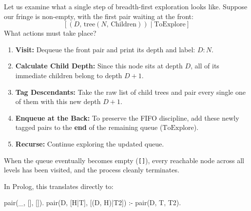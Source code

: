 Let us examine what a single step of breadth-first exploration looks like. Suppose our fringe is non-empty, with the first pair waiting at the front:
\[
[(D,\, \text{tree}(N,\, \text{Children})) \mid \text{ToExplore}]
\]
What actions must take place?
\begin{enumerate}
    \item \textbf{Visit:} Dequeue the front pair and print its depth and label: $D:N$.
    \item \textbf{Calculate Child Depth:} Since this node sits at depth $D$, all of its immediate children belong to depth $D + 1$.
    \item \textbf{Tag Descendants:} Take the raw list of child trees and pair every single one of them with this new depth $D + 1$.
    \item \textbf{Enqueue at the Back:} To preserve the FIFO discipline, add these newly tagged pairs to the \textbf{end} of the remaining queue ($\text{ToExplore}$).
    \item \textbf{Recurse:} Continue exploring the updated queue.
\end{enumerate}
When the queue eventually becomes empty (\texttt{[]}), every reachable node across all levels has been visited, and the process cleanly terminates.



In Prolog, this translates directly to:

\begin{codeblock}
pair(_, [], []).
pair(D, [H|T], [(D, H)|T2]) :-
    pair(D, T, T2).
\end{codeblock}

